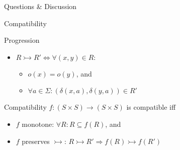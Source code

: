 \documentclass[compress]{beamer}
\begin{document}
\begin{frame}
  \begin{center}
    \huge{Questions \& Discussion}
  \end{center}
\end{frame}

\begin{frame}{Compatibility}
  \begin{block}{Progression}
    \begin{itemize}
      \item $R \rightarrowtail R' \iff \forall (x, y) \in R:$\\
        \begin{itemize}
          \item $o(x) = o(y)$, and
          \item $\forall a \in \Sigma: (\delta(x, a), \delta(y, a)) \in R'$
        \end{itemize}
    \end{itemize}
  \end{block}

  \begin{block}{Compatibility}
    $f : (S \times S) \to (S \times S)$ is compatible iff \\
    \begin{itemize}
      \item $f$ monotone: $\forall R: R \subseteq f(R)$, and
      \item $f$ preserves $\rightarrowtail$:
        $R \rightarrowtail R' \Rightarrow f(R) \rightarrowtail f(R')$
    \end{itemize}
  \end{block}
\end{frame}
\end{document}
